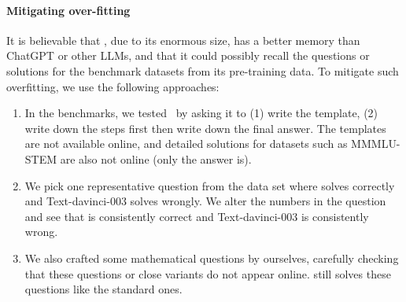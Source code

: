 \paragraph{Mitigating over-fitting} It is believable that {\DV}, due to its enormous size, has a better memory than ChatGPT or other LLMs, and that it could possibly recall the questions or solutions for the benchmark datasets from its pre-training data. To mitigate such overfitting, we use the following approaches:
\begin{enumerate}
    \item In the benchmarks, we tested \DV \ by asking it to (1) write the template, (2) write down the steps first then write down the final answer. The templates are not available online, and detailed solutions for datasets such as MMMLU-STEM are also not online (only the answer is). %
    \item We pick one representative question from the data set where {\DV} solves correctly and Text-davinci-003 solves wrongly. We alter the numbers in the question and see that {\DV} is consistently correct and Text-davinci-003 is consistently wrong. 
    \item We also crafted some mathematical questions by ourselves, carefully checking that these questions or close variants do not appear online. {\DV} still solves these questions like the standard ones. 
\end{enumerate}
